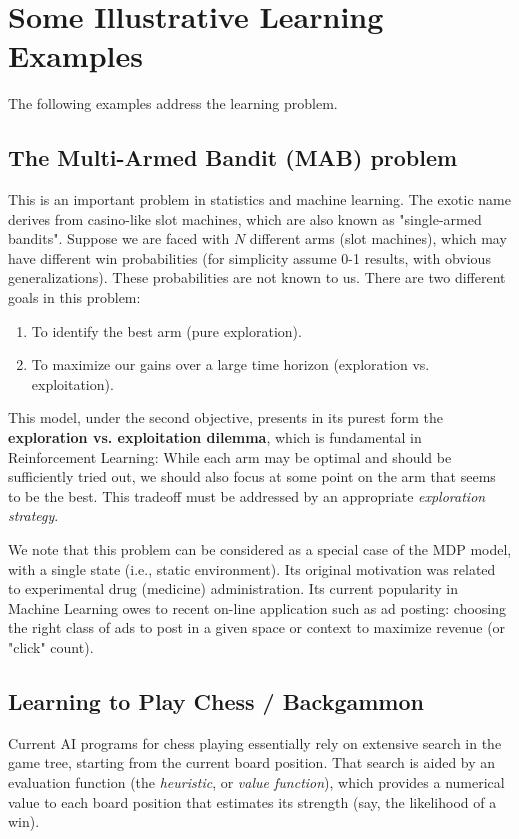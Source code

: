 \section{Some Illustrative Learning Examples}
The following examples address the learning problem.

\subsection{The Multi-Armed Bandit (MAB) problem}
This is an important problem in statistics and machine learning. The exotic name derives from casino-like slot machines, which are also known as "single-armed bandits".
Suppose we are faced with $N$ different arms (slot machines), which may have different win probabilities (for simplicity assume 0-1 results, with obvious generalizations). These probabilities are not known to us.
There are two different goals in this problem:
\begin{enumerate}
  \item To identify the best arm (pure exploration).
  \item To maximize our gains over a large time horizon (exploration vs. exploitation).
\end{enumerate}

This model, under the second objective, presents in its purest form the \textbf{exploration vs. exploitation dilemma}, which is fundamental in Reinforcement Learning: While each arm may be optimal and should be sufficiently tried out, we should also focus at some point on the arm that seems to be the best. This tradeoff must be addressed by an appropriate  \emph{exploration strategy}.

We note that this problem can be considered as a special case of the MDP model, with a single state (i.e., static environment). Its original motivation was related to experimental drug (medicine) administration. Its current popularity in Machine Learning owes to recent on-line application such as ad posting: choosing the right class of ads to post in a given space or context to maximize revenue (or "click" count).

\subsection{Learning to Play Chess / Backgammon}
Current AI programs for chess playing essentially rely on extensive search in the game tree, starting from the current board position. That search is aided by an evaluation function (the \emph{heuristic}, or \emph{value function}), which provides a numerical value to each board position that estimates its strength (say, the likelihood of a win).

